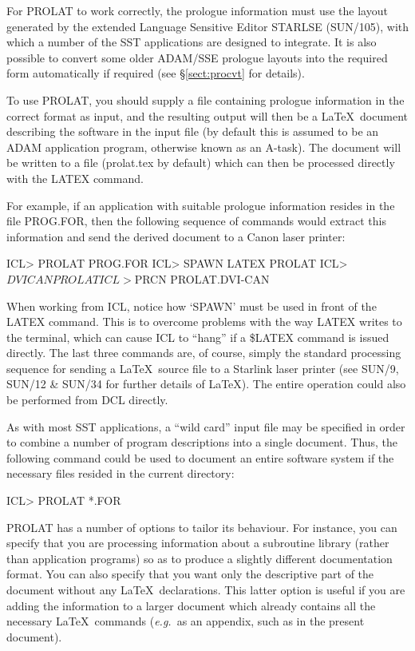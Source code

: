 \documentclass[twoside,11pt,nolof]{starlink}
\begin{document}
For PROLAT to work correctly, the prologue information must use the layout
generated by the extended Language Sensitive Editor STARLSE (SUN/105), with
which a number of the SST applications are designed to integrate.
It is also possible to convert some older ADAM/SSE prologue layouts into the
required form automatically if required (see \S\ref{sect:procvt} for
details).

To use PROLAT, you should supply a file containing prologue information in
the correct format as input, and the resulting output will then be a \LaTeX\
document describing the software in the input file (by default this is
assumed to be an ADAM application program, otherwise known as an A-task).
The document will be written to a file (prolat.tex by default) which can
then be processed directly with the LATEX command.

For example, if an application with suitable prologue information resides in
the file PROG.FOR, then the following sequence of commands would extract this
information and send the derived document to a Canon laser printer:

\begin{terminalv}
ICL> PROLAT PROG.FOR
ICL> SPAWN LATEX PROLAT
ICL> $DVICAN PROLAT
ICL> $PRCN PROLAT.DVI-CAN
\end{terminalv}

When working from ICL, notice how `SPAWN' must be used in front of the LATEX
command.
This is to overcome problems with the way LATEX writes to the terminal, which
can cause ICL to ``hang'' if a \$LATEX command is issued directly.
The last three commands are, of course, simply the standard processing
sequence for sending a \LaTeX\ source file to a Starlink laser printer (see
SUN/9, SUN/12 \& SUN/34 for further details of \LaTeX).
The entire operation could also be performed from DCL directly.

As with most SST applications, a ``wild card'' input file may be specified
in order to combine a number of program descriptions into a single document.
Thus, the following command could be used to document an entire software
system if the necessary files resided in the current directory:

\begin{terminalv}
ICL> PROLAT *.FOR
\end{terminalv}

PROLAT has a number of options to tailor its behaviour.
For instance, you can specify that you are processing information about a
subroutine library (rather than application programs) so as to produce a
slightly different documentation format.
You can also specify that you want only the descriptive part of the document
without any \LaTeX\ declarations.
This latter option is useful if you are adding the information to a larger
document which already contains all the necessary \LaTeX\ commands (\emph{e.g.}\ as an appendix, such as in the present document).
\end{document}

